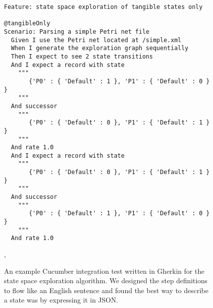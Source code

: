 \begin{figure}
\begin{lstlisting}[language=Cucumber,
                   frame=single, 
                  ]
Feature: state space exploration of tangible states only

@tangibleOnly
Scenario: Parsing a simple Petri net file
  Given I use the Petri net located at /simple.xml
  When I generate the exploration graph sequentially
  Then I expect to see 2 state transitions
  And I expect a record with state
    """
       {'P0' : { 'Default' : 1 }, 'P1' : { 'Default' : 0 } }
    """
  And successor
    """
       {'P0' : { 'Default' : 0 }, 'P1' : { 'Default' : 1 } }
    """
  And rate 1.0
  And I expect a record with state
    """
       {'P0' : { 'Default' : 0 }, 'P1' : { 'Default' : 1 } }
    """
  And successor
    """
       {'P0' : { 'Default' : 1 }, 'P1' : { 'Default' : 0 } }
    """
  And rate 1.0

\end{lstlisting}
\caption{An example Cucumber integration test written in Gherkin for the state space exploration algorithm. We designed the step definitions to flow like an English sentence and found the best way to describe a state was by expressing it in JSON.}, 
\label{lst:cucumber_state_space}
\end{figure}
